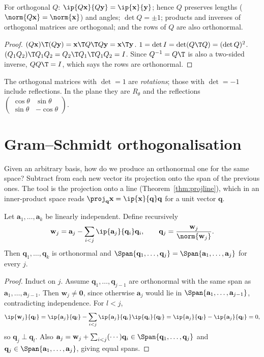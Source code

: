 \begin{theorem}\label{thm:orthprops}
For orthogonal $Q$: $\ip{Q\mathbf{x}}{Q\mathbf{y}}=\ip{\mathbf{x}}{\mathbf{y}}$; hence $Q$ preserves lengths ($\norm{Q\mathbf{x}}=\norm{\mathbf{x}}$) and angles; $\det Q=\pm1$; products and inverses of orthogonal matrices are orthogonal; and the rows of $Q$ are also orthonormal.
\end{theorem}

\begin{proof}
$(Q\mathbf{x})\T(Q\mathbf{y})=\mathbf{x}\T Q\T Q\mathbf{y}=\mathbf{x}\T\mathbf{y}$. $1=\det I=\det(Q\T Q)=(\det Q)^2$. $(Q_1Q_2)\T Q_1Q_2=Q_2\T Q_1\T Q_1Q_2=I$. Since $Q^{-1}=Q\T$ is also a two-sided inverse, $QQ\T=I$, which says the rows are orthonormal.
\end{proof}

The orthogonal matrices with $\det=1$ are \emph{rotations}; those with $\det=-1$ include reflections. In the plane they are $R_\theta$ and the reflections $\begin{pmatrix}\cos\theta&\sin\theta\\\sin\theta&-\cos\theta\end{pmatrix}$.

\section{Gram--Schmidt orthogonalisation}

Given an arbitrary basis, how do we produce an orthonormal one for the same space? Subtract from each new vector its projection onto the span of the previous ones. The tool is the projection onto a line (Theorem~\ref{thm:projline}), which in an inner-product space reads $\proj_{\mathbf{q}}\mathbf{x}=\ip{\mathbf{x}}{\mathbf{q}}\mathbf{q}$ for a unit vector $\mathbf{q}$.

\begin{theorem}\label{thm:gs}
Let $\mathbf{a}_1,\dots,\mathbf{a}_k$ be linearly independent. Define recursively
\[ \mathbf{w}_j=\mathbf{a}_j-\sum_{i<j}\ip{\mathbf{a}_j}{\mathbf{q}_i}\mathbf{q}_i,\qquad\mathbf{q}_j=\frac{\mathbf{w}_j}{\norm{\mathbf{w}_j}}. \]
Then $\mathbf{q}_1,\dots,\mathbf{q}_k$ is orthonormal and $\Span\{\mathbf{q}_1,\dots,\mathbf{q}_j\}=\Span\{\mathbf{a}_1,\dots,\mathbf{a}_j\}$ for every $j$.
\end{theorem}

\begin{proof}
Induct on $j$. Assume $\mathbf{q}_1,\dots,\mathbf{q}_{j-1}$ are orthonormal with the same span as $\mathbf{a}_1,\dots,\mathbf{a}_{j-1}$. Then $\mathbf{w}_j\ne\mathbf{0}$, since otherwise $\mathbf{a}_j$ would lie in $\Span\{\mathbf{a}_1,\dots,\mathbf{a}_{j-1}\}$, contradicting independence. For $l<j$,
\[ \ip{\mathbf{w}_j}{\mathbf{q}_l}=\ip{\mathbf{a}_j}{\mathbf{q}_l}-\sum_{i<j}\ip{\mathbf{a}_j}{\mathbf{q}_i}\ip{\mathbf{q}_i}{\mathbf{q}_l}=\ip{\mathbf{a}_j}{\mathbf{q}_l}-\ip{\mathbf{a}_j}{\mathbf{q}_l}=0, \]
so $\mathbf{q}_j\perp\mathbf{q}_l$. Also $\mathbf{a}_j=\mathbf{w}_j+\sum_{i<j}(\cdots)\mathbf{q}_i\in\Span\{\mathbf{q}_1,\dots,\mathbf{q}_j\}$ and $\mathbf{q}_j\in\Span\{\mathbf{a}_1,\dots,\mathbf{a}_j\}$, giving equal spans.
\end{proof}

